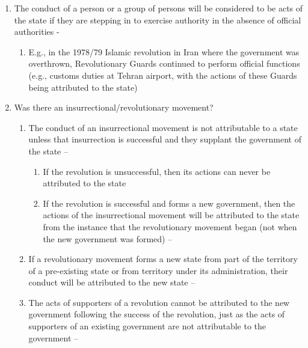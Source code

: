 \begin{enumerate}
\begin{enumerate}
\begin{enumerate}
        \end{enumerate}
        \item The conduct of a person or a group of persons will be considered to be acts of the state if they are stepping in to exercise authority in the absence of official authorities - 
        \begin{enumerate}
            \item E.g., in the 1978/79 Islamic revolution in Iran where the government was overthrown, Revolutionary Guards continued to perform official functions (e.g., customs duties at Tehran airport, with the actions of these Guards being attributed to the state)
        \end{enumerate}
        \item Was there an insurrectional/revolutionary movement?
        \begin{enumerate}
            \item The conduct of an insurrectional movement is not attributable to a state unless that insurrection is successful and they supplant the government of the state -- 
            \begin{enumerate}
                \item If the revolution is unsuccessful, then its actions can never be attributed to the state
                \item If the revolution is successful and forms a new government, then the actions of the insurrectional movement will be attributed to the state from the instance that the revolutionary movement began (not when the new government was formed) -- 
            \end{enumerate}
            \item If a revolutionary movement forms a new state from part of the territory of a pre-existing state or from territory under its administration, their conduct will be attributed to the new state -- 
            \item The acts of supporters of a revolution cannot be attributed to the new government following the success of the revolution, just as the acts of supporters of an existing government are not attributable to the government -- 

\end{enumerate}
\end{enumerate}
\end{enumerate}
